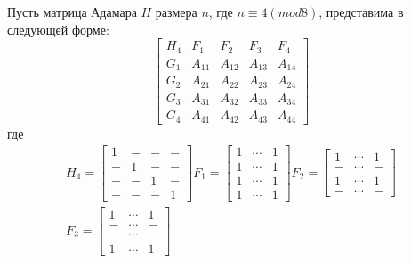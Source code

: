 \documentclass[a4paper, 14pt]{extreport}
\begin{document}
\begin{Df}\normalfont\label{df:switch4}
    Пусть матрица Адамара $H$ размера $n$, где $n \equiv 4(mod8)$, представима в следующей форме:\\
    \begin{equation}\label{eq:m_4mod8}
        \begin{bmatrix}
            H_4 & F_1 & F_2 & F_3 & F_4 \\
            G_1 & A_{11} & A_{12} & A_{13} & A_{14} \\
            G_2 & A_{21} & A_{22} & A_{23} & A_{24} \\
            G_3 & A_{31} & A_{32} & A_{33} & A_{34} \\
            G_4 & A_{41} & A_{42} & A_{43} & A_{44}
        \end{bmatrix}
    \end{equation}
    где\\
    \begin{gather*}
        H_4 =
        \begin{bmatrix}
            1 & - & - & - \\
            - & 1 & - & - \\
            - & - & 1 & - \\
            - & - & - & 1
        \end{bmatrix}
        F_1 =
        \begin{bmatrix}
            1 & \cdots & 1 \\
            1 & \cdots & 1 \\
            1 & \cdots & 1 \\
            1 & \cdots & 1
        \end{bmatrix}
        F_2 =
        \begin{bmatrix}
            1 & \cdots & 1 \\
            - & \cdots & - \\
            1 & \cdots & 1 \\
            - & \cdots & -
        \end{bmatrix}
        \\
        F_3 = \begin{bmatrix}
            1 & \cdots & 1 \\
            - & \cdots & - \\
            - & \cdots & - \\
            1 & \cdots & 1
        \end{bmatrix}

\end{gather*}
\end{Df}
\end{document}
